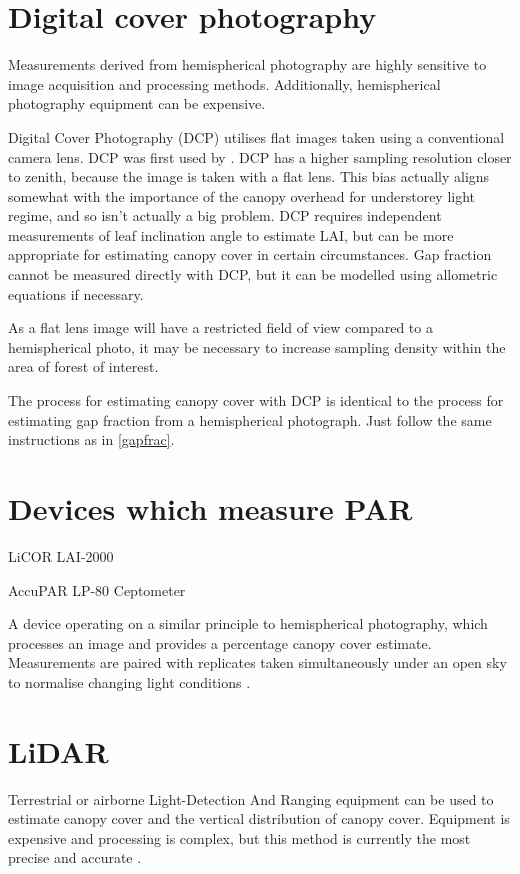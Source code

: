 \documentclass[11pt,a4paper]{article}
\begin{document}
\section{Digital cover photography}

Measurements derived from hemispherical photography are highly sensitive to image acquisition and processing methods. Additionally, hemispherical photography equipment can be expensive.

Digital Cover Photography (DCP) utilises flat images taken using a conventional camera lens. DCP was first used by \citet{Macfarlane2007a, Macfarlane2007b, Macfarlane2007c}. DCP has a higher sampling resolution closer to zenith, because the image is taken with a flat lens. This bias actually aligns somewhat with the importance of the canopy overhead for understorey light regime, and so isn't actually a big problem. DCP requires independent measurements of leaf inclination angle to estimate LAI, but can be more appropriate for estimating canopy cover in certain circumstances. Gap fraction cannot be measured directly with DCP, but it can be modelled using allometric equations if necessary.

As a flat lens image will have a restricted field of view compared to a hemispherical photo, it may be necessary to increase sampling density within the area of forest of interest. 

The process for estimating canopy cover with DCP is identical to the process for estimating gap fraction from a hemispherical photograph. Just follow the same instructions as in \autoref{gapfrac}.

\section{Devices which measure PAR}

LiCOR LAI-2000

AccuPAR LP-80 Ceptometer

A device operating on a similar principle to hemispherical photography, which processes an image and provides a percentage canopy cover estimate. Measurements are paired with replicates taken simultaneously under an open sky to normalise changing light conditions \citep{Gower1991}.

\section{LiDAR}

Terrestrial or airborne Light-Detection And Ranging equipment can be used to estimate canopy cover and the vertical distribution of canopy cover. Equipment is expensive and processing is complex, but this method is currently the most precise and accurate \citep{Seidel2011}.
\end{document}
